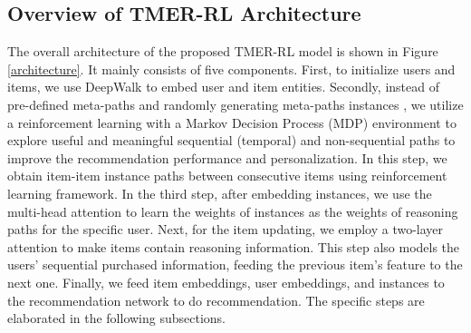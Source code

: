 \subsection{Overview of TMER-RL Architecture}
\label{sec:3.1}
The overall architecture of the proposed TMER-RL model is shown in Figure \ref{architecture}. It mainly consists of five components. First, to initialize users and items, we use DeepWalk \cite{perozzi2014deepwalk} to embed user and item entities. Secondly, 
instead of pre-defined meta-paths and randomly generating meta-paths instances \cite{10.1145/3437963.3441762}, we utilize a reinforcement learning with a Markov Decision Process (MDP) environment to explore useful and meaningful sequential (temporal) and non-sequential paths to improve the recommendation performance and personalization. 
In this step, we obtain item-item instance paths between consecutive items using reinforcement learning framework. In the third step, after embedding instances, we use the multi-head attention to learn the weights of instances as the weights of reasoning paths for the specific user. Next, for the item updating, we employ a two-layer attention to make items contain reasoning information. 
This step also models the users' sequential purchased information, feeding the previous item's feature to the next one. Finally, we feed item embeddings, user embeddings, and instances to the recommendation network to do recommendation. The specific steps are elaborated in the following subsections. 


